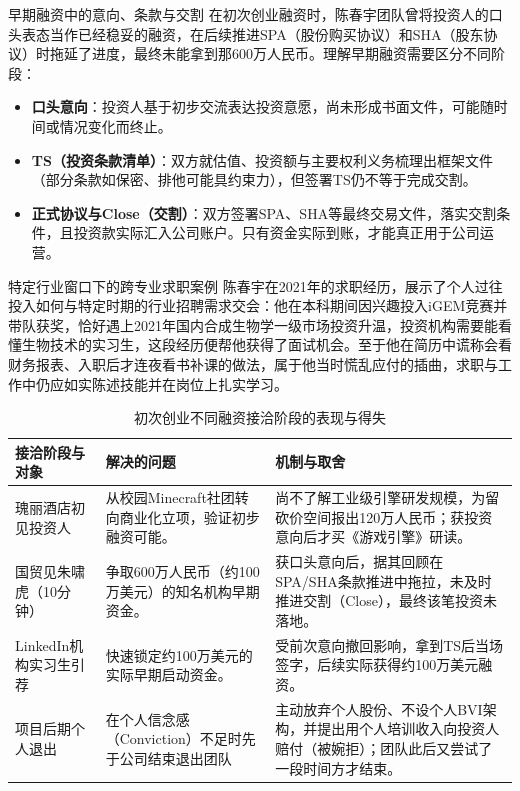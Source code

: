 \documentclass[UTF8,a4paper,11pt,fontset=fandol]{ctexart}
\begin{document}
\begin{importantbox}{早期融资中的意向、条款与交割}
在初次创业融资时，陈春宇团队曾将投资人的口头表态当作已经稳妥的融资，在后续推进SPA（股份购买协议）和SHA（股东协议）时拖延了进度，最终未能拿到那600万人民币。理解早期融资需要区分不同阶段：
\begin{itemize}
\item \textbf{口头意向}：投资人基于初步交流表达投资意愿，尚未形成书面文件，可能随时间或情况变化而终止。
\item \textbf{TS（投资条款清单）}：双方就估值、投资额与主要权利义务梳理出框架文件（部分条款如保密、排他可能具约束力），但签署TS仍不等于完成交割。
\item \textbf{正式协议与Close（交割）}：双方签署SPA、SHA等最终交易文件，落实交割条件，且投资款实际汇入公司账户。只有资金实际到账，才能真正用于公司运营。
\end{itemize}
\end{importantbox}
\begin{knowledgebox}{特定行业窗口下的跨专业求职案例}
陈春宇在2021年的求职经历，展示了个人过往投入如何与特定时期的行业招聘需求交会：他在本科期间因兴趣投入iGEM竞赛并带队获奖，恰好遇上2021年国内合成生物学一级市场投资升温，投资机构需要能看懂生物技术的实习生，这段经历便帮他获得了面试机会。至于他在简历中谎称会看财务报表、入职后才连夜看书补课的做法，属于他当时慌乱应付的插曲，求职与工作中仍应如实陈述技能并在岗位上扎实学习。
\end{knowledgebox}
\begin{table}[H]\centering\small
\caption{初次创业不同融资接洽阶段的表现与得失}
\begin{tabular}{>{\raggedright\arraybackslash}p{\dimexpr(\linewidth-6\tabcolsep)/3\relax}>{\raggedright\arraybackslash}p{\dimexpr(\linewidth-6\tabcolsep)/3\relax}>{\raggedright\arraybackslash}p{\dimexpr(\linewidth-6\tabcolsep)/3\relax}}
\toprule
接洽阶段与对象 & 解决的问题 & 机制与取舍\\\midrule
瑰丽酒店初见投资人 & 从校园Minecraft社团转向商业化立项，验证初步融资可能。 & 尚不了解工业级引擎研发规模，为留砍价空间报出120万人民币；获投资意向后才买《游戏引擎》研读。\\[4pt]
国贸见朱啸虎（10分钟） & 争取600万人民币（约100万美元）的知名机构早期资金。 & 获口头意向后，据其回顾在SPA/SHA条款推进中拖拉，未及时推进交割（Close），最终该笔投资未落地。\\[4pt]
LinkedIn机构实习生引荐 & 快速锁定约100万美元的实际早期启动资金。 & 受前次意向撤回影响，拿到TS后当场签字，后续实际获得约100万美元融资。\\[4pt]
项目后期个人退出 & 在个人信念感（Conviction）不足时先于公司结束退出团队 & 主动放弃个人股份、不设个人BVI架构，并提出用个人培训收入向投资人赔付（被婉拒）；团队此后又尝试了一段时间方才结束。\\[4pt]
\bottomrule\end{tabular}\end{table}
\end{document}
